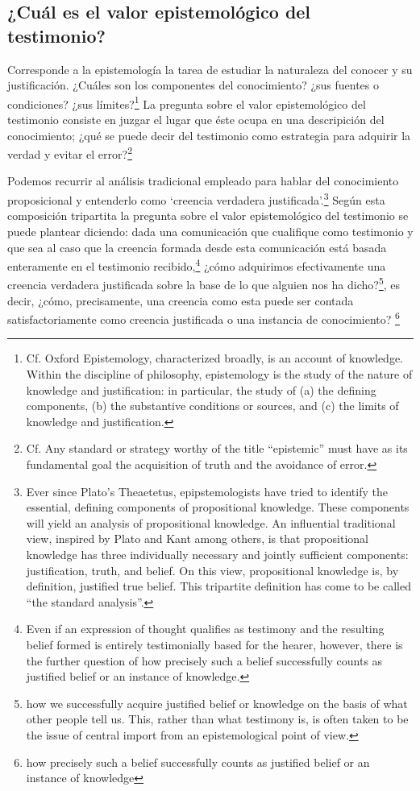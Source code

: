 \subsection{¿Cuál es el valor epistemológico del testimonio?}
Corresponde a la epistemología la tarea de estudiar la naturaleza del conocer y
su justificación. ¿Cuáles son los componentes del conocimiento? ¿sus fuentes o
condiciones? ¿sus límites?\footnote{Cf. Oxford Epistemology, characterized
  broadly, is an account of knowledge. Within the discipline of philosophy,
  epistemology is the study of the nature of knowledge and justification: in
  particular, the study of (a) the defining components, (b) the substantive
  conditions or sources, and (c) the limits of knowledge and justification.} La
pregunta sobre el valor epistemológico del testimonio consiste en juzgar el
lugar que éste ocupa en una descripición del conocimiento; ¿qué se puede decir
del testimonio como estrategia para adquirir la verdad y evitar el
error?\footnote{Cf. Any standard or strategy worthy of the title ``epistemic''
  must have as its fundamental goal the acquisition of truth and the avoidance
  of error.}

Podemos recurrir al análisis tradicional empleado para hablar del conocimiento
proposicional y entenderlo como `creencia verdadera justificada'.\footnote{Ever
  since Plato's Theaetetus, epipstemologists have tried to identify the
  essential, defining components of propositional knowledge. These components
  will yield an analysis of propositional knowledge. An influential traditional
  view, inspired by Plato and Kant among others, is that propositional knowledge
  has three individually necessary and jointly sufficient components:
  justification, truth, and belief. On this view, propositional knowledge is, by
  definition, justified true belief. This tripartite definition has come to be
  called ``the standard analysis''.} Según esta composición tripartita la
pregunta sobre el valor epistemológico del testimonio se puede plantear
diciendo: dada una comunicación que cualifique como testimonio y que sea al caso
que la creencia formada desde esta comunicación está basada enteramente en el
testimonio recibido,\footnote{Even if an expression of thought qualifies as
  testimony and the resulting belief formed is entirely testimonially based for
  the hearer, however, there is the further question of how precisely such a
  belief successfully counts as justified belief or an instance of knowledge.}
¿cómo adquirimos efectivamente una creencia verdadera justificada sobre la base
de lo que alguien nos ha dicho?\footnote{how we successfully acquire justified
  belief or knowledge on the basis of what other people tell us. This, rather
  than what testimony is, is often taken to be the issue of central import from
  an epistemological point of view.}, es decir, ¿cómo, precisamente, una
creencia como esta puede ser contada satisfactoriamente como creencia
justificada o una instancia de conocimiento? \footnote{how precisely such a
  belief successfully counts as justified belief or an instance of knowledge}

